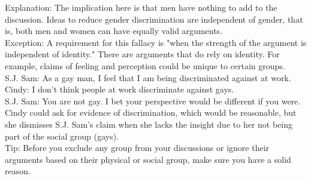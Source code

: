 \documentclass[a4paper,12pt,single,pdftex]{scrartcl}
\begin{document}
    
      Explanation: The implication here is that men have nothing to add to the discussion. Ideas to reduce gender discrimination are independent of gender, that is, both men and women can have equally valid arguments.
    \\

    
      Exception: A requirement for this fallacy is "when the strength of the argument is independent of identity." There are arguments that do rely on identity. For example, claims of feeling and perception could be unique to certain groups.
    \\

    
      S.J. Sam: As a gay man, I feel that I am being discriminated against at work.
    \\

    
      Cindy: I don't think people at work discriminate against gays.
    \\

    
      S.J. Sam: You are not gay. I bet your perspective would be different if you were.
    \\

    
      Cindy could ask for evidence of discrimination, which would be reasonable, but she dismisses S.J. Sam's claim when she lacks the insight due to her not being part of the social group (gays).
    \\

    
      Tip: Before you exclude any group from your discussions or ignore their arguments based on their physical or social group, make sure you have a solid reason.
    \\

  
\end{document}
